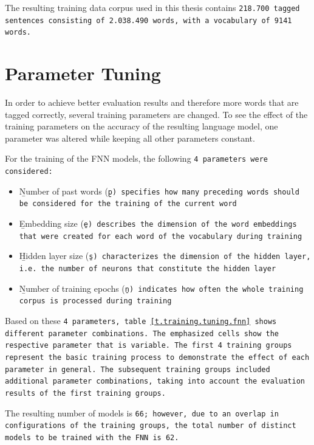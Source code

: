 The resulting training data corpus used in this thesis contains \tt{218.700} tagged sentences consisting of \tt{2.038.490} words, with a vocabulary of \tt{9141} words.

\section{Parameter Tuning}\label{c.training.tuning}
In order to achieve better evaluation results and therefore more words that are tagged correctly, several training parameters are changed. To see the effect of the training parameters on the accuracy of the resulting language model, one parameter was altered while keeping all other parameters constant.

For the training of the FNN models, the following \tt{4} parameters were considered:

\begin{itemize}
	\item \b{Number of past words} (\tt{\b{p}}) specifies how many preceding words should be considered for the training of the current word
	\item \b{Embedding size} (\tt{\b{e}}) describes the dimension of the word embeddings that were created for each word of the vocabulary during training
	\item \b{Hidden layer size} (\tt{\b{s}}) characterizes the dimension of the hidden layer, i.e. the number of neurons that constitute the hidden layer
	\item \b{Number of training epochs} (\tt{\b{n}}) indicates how often the whole training corpus is processed during training
\end{itemize}

Based on these \tt{4} parameters, table \ref{t.training.tuning.fnn} shows different parameter combinations. The emphasized cells show the respective parameter that is variable. The first \tt{4} training groups represent the basic training process to demonstrate the effect of each parameter in general. The subsequent training groups included additional parameter combinations, taking into account the evaluation results of the first training groups.

The resulting number of models is \tt{66}; however, due to an overlap in configurations of the training groups, the total number of distinct models to be trained with the FNN is \tt{62}.

